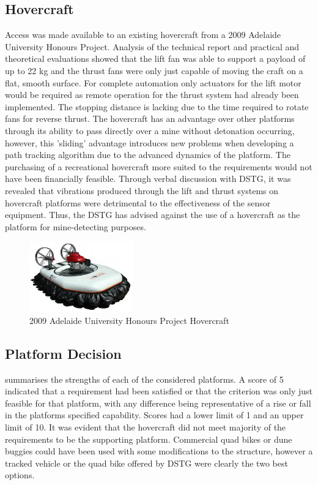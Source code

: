 \documentclass[main.tex]{subfiles}
\begin{document}
\subsection{Hovercraft}
Access was made available to an existing hovercraft from a 2009 Adelaide University Honours Project. Analysis of the technical report \parencite{hovercraft2009} and practical and theoretical evaluations showed that the lift fan was able to support a payload of up to 22 kg and the thrust fans were only just capable of moving the craft on a flat, smooth surface. For complete automation only actuators for the lift motor would be required as remote operation for the thrust system had already been implemented. The stopping distance is lacking due to the time required to rotate fans for reverse thrust. The hovercraft has an advantage over other platforms through its ability to pass directly over a mine without detonation occurring, however, this 'sliding' advantage introduces new problems when developing a path tracking algorithm due to the advanced dynamics of the platform. The purchasing of a recreational hovercraft more suited to the requirements would not have been financially feasible. Through verbal discussion with DSTG, it was revealed that vibrations produced through the lift and thrust systems on hovercraft platforms were detrimental to the effectiveness of the sensor equipment. Thus, the DSTG has advised against the use of a hovercraft as the platform for mine-detecting purposes.
\begin{figure}[ht]
\includegraphics[width=0.4\textwidth]{4-ConceptDesign/HovercraftPic.png}
\centering
\caption[2009 Adelaide University Honours Project Hovercraft]{2009 Adelaide University Honours Project Hovercraft \parencite{hovercraft2009}} 
\end{figure}

\subsection{Platform Decision}
 summarises the strengths of each of the considered platforms. A score of 5 indicated that a requirement had been satisfied or that the criterion was only just feasible for that platform, with any difference being representative of a rise or fall in the platforms specified capability. Scores had a lower limit of 1 and an upper limit of 10. It was evident that the hovercraft did not meet majority of the requirements to be the supporting platform. Commercial quad bikes or dune buggies could have been used with some modifications to the structure, however a tracked vehicle or the quad bike offered by DSTG were clearly the two best options.
\end{document}
